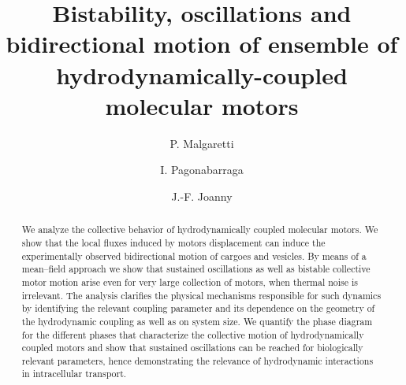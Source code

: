 \documentclass[prl,aps,twocolumn, floatfix, superscriptaddress,showpacs]{revtex4}
\begin{document}
\title{Bistability, oscillations and bidirectional motion of ensemble of hydrodynamically-coupled molecular motors}

\author{P. Malgaretti}
\author{I. Pagonabarraga}
\author{J.-F. Joanny}

\begin{abstract}

We analyze  the collective behavior of hydrodynamically coupled molecular motors. We show that the local fluxes induced by motors displacement can induce the experimentally observed bidirectional motion of cargoes and vesicles. 
By means of a mean--field approach we show that  sustained oscillations as well as bistable collective motor motion arise even for very large collection of motors, when thermal noise is irrelevant.  The analysis clarifies the physical mechanisms responsible for such dynamics by identifying the relevant coupling parameter and its dependence on the geometry of the hydrodynamic coupling as well as on system size. We quantify the phase diagram for the different phases that characterize the collective motion of hydrodynamically coupled motors and show that sustained oscillations can be reached for biologically relevant parameters, hence demonstrating the relevance of hydrodynamic interactions in intracellular transport.

\end{abstract}
%
\keywords{===}
\end{document}
